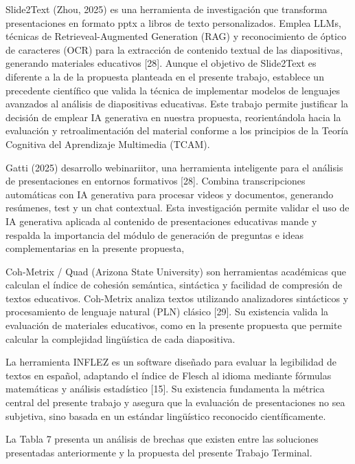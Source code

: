 \documentclass[11pt]{article}
\begin{document}
Slide2Text (Zhou, 2025) es una herramienta de investigación que transforma presentaciones en formato pptx a libros de texto personalizados. Emplea LLMs, técnicas de Retrieveal-Augmented Generation (RAG) y reconocimiento de óptico de caracteres (OCR) para la extracción de contenido textual de las diapositivas, generando materiales educativos [28]. Aunque el objetivo de Slide2Text es diferente a la de la propuesta planteada en el presente trabajo, establece un precedente científico que valida la técnica de implementar modelos de lenguajes avanzados al análisis de diapositivas educativas. Este trabajo permite justificar la decisión de emplear IA generativa en nuestra propuesta, reorientándola hacia la evaluación y retroalimentación del material conforme a los principios de la Teoría Cognitiva del Aprendizaje Multimedia (TCAM).

Gatti (2025) desarrollo webinariitor, una herramienta inteligente para el análisis de presentaciones en entornos formativos [28]. Combina transcripciones automáticas con IA generativa para procesar videos y documentos, generando resúmenes, test y un chat contextual. Esta investigación permite validar el uso de IA generativa aplicada al contenido de presentaciones educativas
mande y respalda la importancia del módulo de generación de preguntas e ideas complementarias en la presente propuesta,

Coh-Metrix / Quad (Arizona State University) son herramientas académicas que calculan el índice de cohesión semántica, sintáctica y facilidad de compresión de textos educativos. Coh-Metrix analiza textos utilizando analizadores sintácticos y procesamiento de lenguaje natural (PLN) clásico [29]. Su existencia valida la evaluación de materiales educativos, como en la presente propuesta que permite calcular la complejidad lingüística de cada diapositiva.

La herramienta INFLEZ es un software diseñado para evaluar la legibilidad de textos en español, adaptando el índice de Flesch al idioma mediante fórmulas matemáticas y análisis estadístico [15]. Su existencia fundamenta la métrica central del presente trabajo y asegura que la evaluación de presentaciones no sea subjetiva, sino basada en un estándar lingüístico reconocido científicamente.

La Tabla 7 presenta un análisis de brechas que existen entre las soluciones presentadas anteriormente y la propuesta del presente Trabajo Terminal. 
\end{document}
